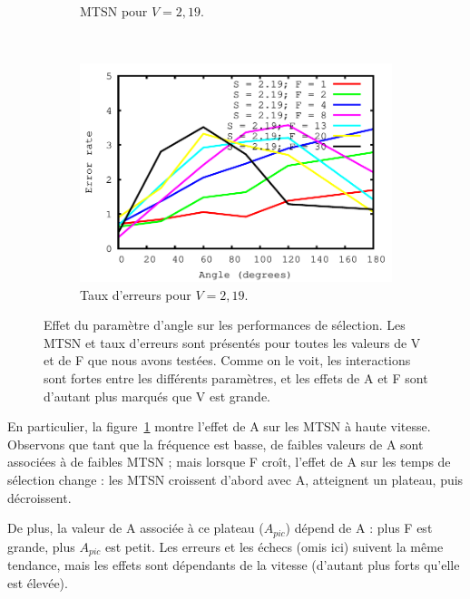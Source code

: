 \begin{figure}[!htb]
\begin{subfigure}[t]{\subImgWlineplot}
			\caption{MTSN pour $V = 2,19$.}
			\label{fig:aEffect_t_219}
		\end{subfigure}
		~
		\begin{subfigure}[t]{\subImgWlineplot}
			\centering
			\includegraphics[width=\textwidth]{figures/ch4/angle_speed_2_19_errors}
			\caption{Taux d'erreurs pour $V = 2,19$.}
			\label{fig:aEffect_e_219}
		\end{subfigure}
		\caption[Effet du paramètre d'angle sur les performances de sélection]{Effet du paramètre d'angle sur les performances de sélection. Les MTSN et taux d'erreurs sont présentés pour toutes les valeurs de V et de F que nous avons testées. Comme on le voit, les interactions sont fortes entre les différents paramètres, et les effets de A et F sont d'autant plus marqués que V est grande.}
		\label{fig:aEffectPerf}
	\end{figure}
	
	En particulier, la figure~\ref{fig:aEffect_t_219} montre l'effet de A sur les MTSN à haute vitesse. Observons que tant que la fréquence est basse, de faibles valeurs de A sont associées à de faibles MTSN ; mais lorsque F croît, l'effet de A sur les temps de sélection change : les MTSN croissent d'abord avec A, atteignent un plateau, puis décroissent.
	
	De plus, la valeur de A associée à ce plateau ($A_{pic}$) dépend de A : plus F est grande, plus $A_{pic}$ est petit. Les erreurs et les échecs (omis ici) suivent la même tendance, mais les effets sont dépendants de la vitesse (d'autant plus forts qu'elle est élevée).

